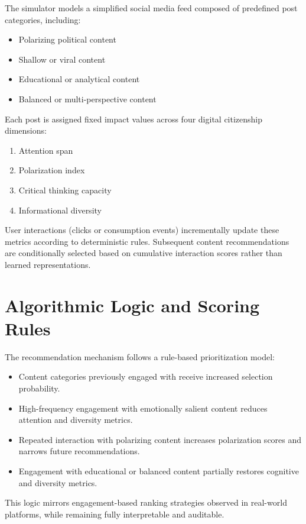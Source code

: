 \documentclass[12pt,a4paper]{report}
\begin{document}
The simulator models a simplified social media feed composed of predefined post categories, including:

\begin{itemize}
  \item Polarizing political content
  \item Shallow or viral content
  \item Educational or analytical content
  \item Balanced or multi-perspective content
\end{itemize}

Each post is assigned fixed impact values across four digital citizenship dimensions:
\begin{enumerate}
  \item Attention span
  \item Polarization index
  \item Critical thinking capacity
  \item Informational diversity
\end{enumerate}

User interactions (clicks or consumption events) incrementally update these metrics according to deterministic rules. Subsequent content recommendations are conditionally selected based on cumulative interaction scores rather than learned representations.

\section{Algorithmic Logic and Scoring Rules}

The recommendation mechanism follows a rule-based prioritization model:

\begin{itemize}
  \item Content categories previously engaged with receive increased selection probability.
  \item High-frequency engagement with emotionally salient content reduces attention and diversity metrics.
  \item Repeated interaction with polarizing content increases polarization scores and narrows future recommendations.
  \item Engagement with educational or balanced content partially restores cognitive and diversity metrics.
\end{itemize}

This logic mirrors engagement-based ranking strategies observed in real-world platforms, while remaining fully interpretable and auditable.
\end{document}
